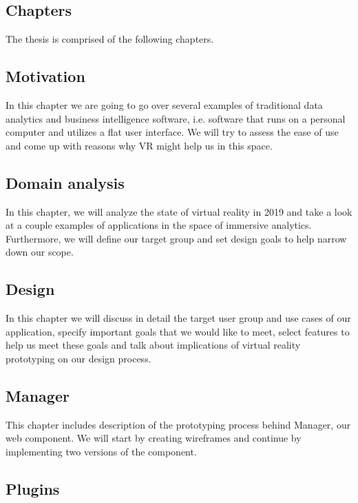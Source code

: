 \documentclass[thesis=M,english,hidelinks]{FITthesisXE}[2012/06/26]
\begin{document}
\begin{introduction}
\section{Chapters}

The thesis is comprised of the following chapters.

\subsection{Motivation}

In this chapter we are going to go over several examples of traditional data analytics and business intelligence software, i.e. software that runs on a personal computer and utilizes a flat user interface. We will try to assess the ease of use and come up with reasons why VR might help us in this space.

\subsection{Domain analysis}

In this chapter, we will analyze the state of virtual reality in 2019 and take a look at a couple examples of applications in the space of immersive analytics. Furthermore, we will define our target group and set design goals to help narrow down our scope.

\newpage

\subsection{Design}

In this chapter we will discuss in detail the target user group and use cases of our application, specify important goals that we would like to meet, select features to help us meet these goals and talk about implications of virtual reality prototyping on our design process.

\subsection{Manager}

This chapter includes description of the prototyping process behind Manager, our web component. We will start by creating wireframes and continue by implementing two versions of the component.

\subsection{Plugins}


\end{introduction}
\end{document}
